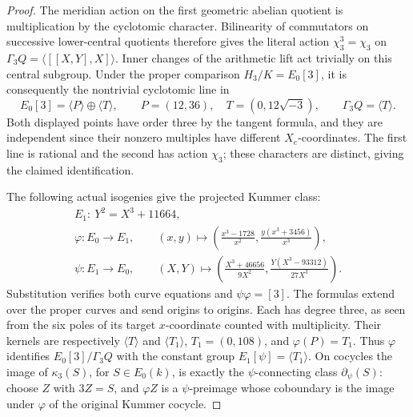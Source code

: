 \begin{proof}
The meridian action on the first geometric abelian quotient is
multiplication by the cyclotomic character.  Bilinearity of
commutators on successive lower-central quotients therefore gives
the literal action \(\chi_3^3=\chi_3\) on
\(\Gamma_3Q=\langle[[X,Y],X]\rangle\).  Inner changes of the
arithmetic lift act trivially on this central subgroup.  Under the
proper comparison \(H_3/K=E_0[3]\), it is consequently the
nontrivial cyclotomic line in
\[
 E_0[3]=\langle P\rangle\oplus\langle T\rangle,\qquad
        P=(12,36),\quad T=(0,12\sqrt{-3}),\qquad
                 \Gamma_3Q=\langle T\rangle.
\tag{A.172.20}
\]
Both displayed points have order three by the tangent formula, and
they are independent since their nonzero multiples have different
\(X_e\)-coordinates.  The first line is rational and the second
has action \(\chi_3\); these characters are distinct, giving the
claimed identification.

The following actual isogenies give the projected Kummer class:
\[
 \begin{gathered}
 E_1:\ Y^2=X^3+11664,\\
 \varphi:E_0\longrightarrow E_1,\qquad
 (x,y)\longmapsto
   \left(\frac{x^3-1728}{x^2},
               \frac{y(x^3+3456)}{x^3}\right),\\
 \psi:E_1\longrightarrow E_0,\qquad
 (X,Y)\longmapsto
   \left(\frac{X^3+46656}{9X^2},
               \frac{Y(X^3-93312)}{27X^3}\right).
 \end{gathered}
\tag{A.172.21}
\]
Substitution verifies both curve equations and
\(\psi\varphi=[3]\).  The formulas extend over the proper
curves and send origins to origins.  Each has degree three, as
seen from the six poles of its target \(x\)-coordinate counted
with multiplicity.  Their kernels are respectively
\(\langle T\rangle\) and
\(\langle T_1\rangle\), \(T_1=(0,108)\), and
\(\varphi(P)=T_1\).
Thus \(\varphi\) identifies \(E_0[3]/\Gamma_3Q\) with the
constant group \(E_1[\psi]=\langle T_1\rangle\).
On cocycles the image of \(\kappa_3(S)\), for
\(S\in E_0(k)\), is exactly the \(\psi\)-connecting class
\(\partial_\psi(S)\): choose \(Z\) with \(3Z=S\), and
\(\varphi Z\) is a \(\psi\)-preimage whose coboundary is the
image under \(\varphi\) of the original Kummer cocycle.


\end{proof}
